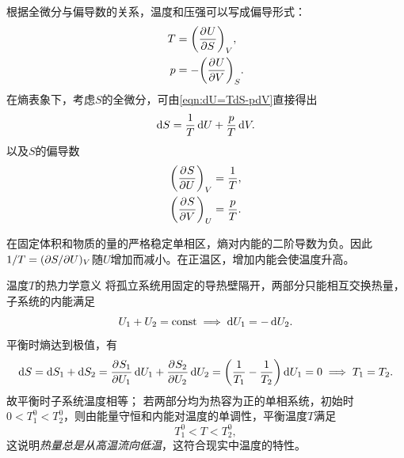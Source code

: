 \begin{corollary}
	根据全微分与偏导数的关系，温度和压强可以写成偏导形式：
	\begin{subequations}
		\begin{align}
			T &= \biggl(\frac{\partial^{}U}{\partial{S}^{}}\biggr)_{V},\\
			p &= -\biggl(\frac{\partial^{}U}{\partial{V}^{}}\biggr)_{S}.
		\end{align}
	\end{subequations}
	在熵表象下，考虑$S$的全微分，可由\eqref{eqn:dU=TdS-pdV}直接得出
	\begin{equation}
		\mathop{}\!\mathrm{d} S = \frac1T\mathop{}\!\mathrm{d} U + \frac pT\mathop{}\!\mathrm{d} V.
	\end{equation}
	以及$S$的偏导数
	\begin{subequations}
		\begin{align}
			\biggl(\frac{\partial^{}S}{\partial{U}^{}}\biggr)_{V} &= \frac1T,\\
			\biggl(\frac{\partial^{}S}{\partial{V}^{}}\biggr)_{U} &= \frac pT.
		\end{align}
	\end{subequations}
\end{corollary}



\begin{corollary}
	在固定体积和物质的量的严格稳定单相区，熵对内能的二阶导数为负。因此$1/T = (\partial S/\partial U)_V$随$U$增加而减小。在正温区，增加内能会使温度升高。
\end{corollary}

\begin{example}
	{温度$T$的热力学意义}{}
	将孤立系统用固定的导热壁隔开，两部分只能相互交换热量，子系统的内能满足
	\[
		U_1 + U_2 = \mathrm{const} \implies \mathop{}\!\mathrm{d} U_1 = -\mathop{}\!\mathrm{d} U_2.
	\]
	平衡时熵达到极值，有
	\[
		\mathop{}\!\mathrm{d} S = \mathop{}\!\mathrm{d} S_1 + \mathop{}\!\mathrm{d} S_2 = \frac{\partial^{}S_1}{\partial{U_1}^{}}\mathop{}\!\mathrm{d} U_1 + \frac{\partial^{}S_2}{\partial{U_2}^{}}\mathop{}\!\mathrm{d} U_2 = \biggl(\frac1{T_1} - \frac1{T_2}\biggr)\mathop{}\!\mathrm{d} U_1 = 0 \implies T_1 = T_2.
	\]
	故平衡时子系统温度相等；
	若两部分均为热容为正的单相系统，初始时$0 < T_1^0 < T_2^0$，则由能量守恒和内能对温度的单调性，平衡温度$T$满足
	\[
		T_1^0 < T < T_2^0,
	\]
	这说明\textit{热量总是从高温流向低温}，这符合现实中温度的特性。
\end{example}

